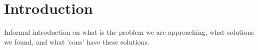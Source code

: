 \chapter{Introduction}

Informal introduction on what is the problem we are approaching, what solutions we found, and what 'cons' have these solutions.
